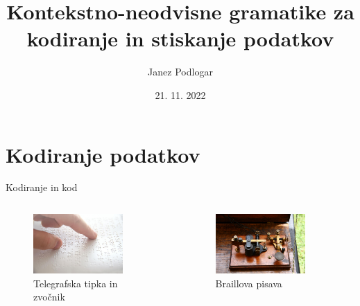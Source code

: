 \documentclass{beamer}
\title[Gramatike za kodiranje podatkov]{Kontekstno-neodvisne gramatike za kodiranje in stiskanje podatkov}
\author{Janez Podlogar}
\institute[UL-FMF]{Univerza v Ljubljani, Fakulteta za matematiko in fiziko}
\date[November 2022]{21. 11. 2022}
\theoremstyle{definition} %
\begin{document}
\begin{frame}
    \titlepage
\end{frame}

\section{Kodiranje podatkov}

\begin{frame}{Kodiranje in kod}

\begin{columns}[c]
    \begin{column}{.5\textwidth}
        \begin{figure}
            \centering
            \includegraphics[width=0.8\textwidth]{Braillova_pisava.jpg}
            \caption{Telegrafska tipka in zvočnik}
        \end{figure}
    \end{column}

    \begin{column}{.5\textwidth}
        \begin{figure}
            \centering
            \includegraphics[width=0.8\textwidth]{Key_Sounder.jpg}
            \caption{Braillova pisava}
        \end{figure}
    \end{column}
\end{columns}

\end{frame}
\end{document}
